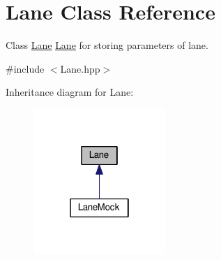 \hypertarget{classLane}{}\section{Lane Class Reference}
\label{classLane}


Class \hyperlink{classLane}{Lane} \hyperlink{classLane}{Lane} for storing parameters of lane.  




{\ttfamily \#include $<$Lane.\+hpp$>$}



Inheritance diagram for Lane\+:
\nopagebreak
\begin{figure}[H]
\begin{center}
\leavevmode
\includegraphics[width=142pt]{classLane__inherit__graph}
\end{center}
\end{figure}
